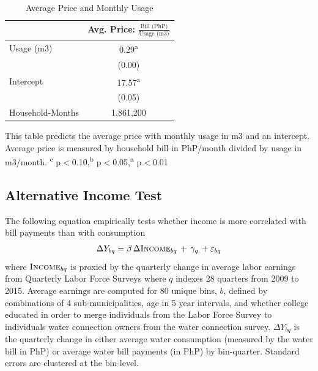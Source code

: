 \documentclass[12pt]{article}
\begin{document}
\begin{table}[H]
\small
\centering
\caption{Average Price and Monthly Usage}\label{table:tcd_predict}
\begin{threeparttable}
\begin{tabular}{lc}
\toprule
& \small Avg. Price: $\frac{\text{Bill (PhP)}}{\text{Usage (m3)}}$    \\
\midrule 
Usage (m3)          &        0.29\textsuperscript{a}\\
                    &      (0.00)                   \\[0.5em]
Intercept           &       17.57\textsuperscript{a}\\
                    &      (0.05)                   \\[0.5em]
Household-Months    &   1,861,200                   \\
\bottomrule
\end{tabular}
\begin{tablenotes}
\item
\footnotesize
This table predicts the average price with monthly usage in m3 and an intercept.  Average price is measured by household bill in PhP/month divided by usage in m3/month.  \textsuperscript{c} p$<$0.10,\textsuperscript{b} p$<$0.05,\textsuperscript{a} p$<$0.01
\end{tablenotes}
\end{threeparttable}
\end{table}

\subsection{Alternative Income Test}\label{appendix:alternativeincome}

The following equation empirically tests whether income is more correlated with bill payments than with consumption
\begin{align*}
\Delta Y_{bq} = \beta\, \Delta \textsc{Income}_{bq} \,+\, \gamma_q \,+\varepsilon_{bq}
\end{align*}
where $\textsc{Income}_{bq}$ is proxied by the quarterly change in average labor earnings from Quarterly Labor Force Surveys where $q$ indexes 28 quarters from 2009 to 2015.  Average earnings are computed for 80 unique bins, $b$, defined by combinations of 4 sub-municipalities, age in 5 year intervals, and whether college educated in order to merge individuals from the Labor Force Survey to individuals water connection owners from the water connection survey.  $\Delta Y_{bq}$ is the quarterly change in either average water consumption (measured by the water bill in PhP) or average water bill payments (in PhP) by bin-quarter.  Standard errors are clustered at the bin-level.
\end{document}
